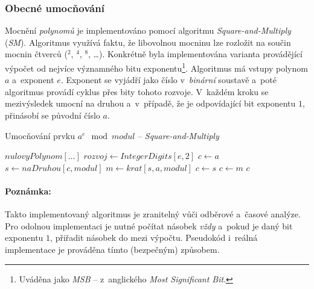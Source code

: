 \documentclass[thesis=M,czech,hidelinks]{FITthesis}[2012/06/26]
\newcommand{\0}{{\textcolor[gray]{0.75}{0}}}
\newenvironment{algoritmus}{
    \floatname{algorithm}{Algoritmus}
    \begin{algorithm}
}{\end{algorithm}}
\begin{document}
\subsubsection{Obecné umocňování}

Mocnění \emph{polynomů} je implementováno pomocí algoritmu
\emph{Square-and-Multiply} (\emph{SM}). Algoritmus využívá faktu, že libovolnou
mocninu lze rozložit na součin mocnin čtverců ($^2$, $^4$, $^8$, \ldots). Konkrétně
byla implementována varianta provádějící výpočet od nejvíce významného bitu
exponentu\footnote{
    Uváděna jako \emph{MSB} -- z~anglického \emph{Most Significant Bit}.
}. Algoritmus má vstupy polynom $a$ a~exponent $e$. Exponent se vyjádří jako
číslo v~\emph{binární} soustavě a~poté algoritmus provádí cyklus přes bity
tohoto rozvoje. V~každém kroku se mezivýsledek umocní na druhou a~v~případě, že
je odpovídající bit exponentu $1$, přinásobí se původní číslo $a$.


\begin{algoritmus}[!ht]
    \caption{Umocňování prvku $a^e \mod modul$ -- \emph{Square-and-Multiply}}
    \begin{algorithmic}[1]
            \State \Return $nulovyPolynom[\ldots]$
        \EndIf
        \State $ rozvoj \gets IntegerDigits[ e, 2 ] $
        \State $ c \gets a $
            \State $ s \gets naDruhou[ c, modul ] $
            \State $ m \gets krat[ s, a, modul ] $
                \State $ c \gets s $
            \Else
                \State $ c \gets m $
            \EndIf
        \EndFor
        \State \Return $c$
     \EndFunction
    \end{algorithmic}
\end{algoritmus}


\paragraph{Poznámka:} Takto implementovaný algoritmus je zranitelný vůči
odběrové a~časové analýze. Pro odolnou implementaci je nutné počítat násobek
\emph{vždy} a~pokud je daný bit exponentu $1$, přiřadit násobek do mezi výpočtu.
Pseudokód i~reálná implementace je prováděna tímto (bezpečným) způsobem.

\vfil
\end{document}
